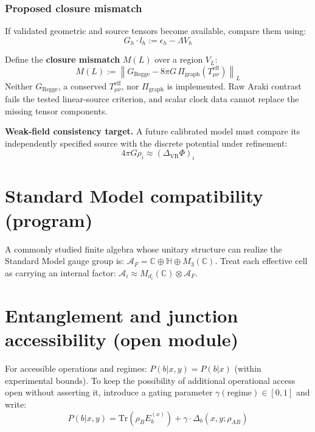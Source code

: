 \documentclass[reprint, amsmath, amssymb, aps, prd]{revtex4-2}
\begin{document}
\subsubsection{Proposed closure mismatch}
If validated geometric and source tensors become available, compare them using:
\begin{equation}
G_h \cdot l_h := \epsilon_h - \Lambda V_h
\end{equation}

Define the \textbf{closure mismatch} $M(L)$ over a region $V_L$:
\begin{equation}
M(L) := \left\| G_{\text{Regge}} - 8\pi G \, \Pi_{\text{graph}}(T_{\mu\nu}^{\text{eff}}) \right\|_L
\end{equation}
Neither $G_{\text{Regge}}$, a conserved $T_{\mu\nu}^{\text{eff}}$, nor $\Pi_{\text{graph}}$ is implemented. Raw Araki contrast fails the tested linear-source criterion, and scalar clock data cannot replace the missing tensor components.

\textbf{Weak-field consistency target.} A future calibrated model must compare its independently specified source with the discrete potential under refinement:
\begin{equation}
4\pi G \rho_i \approx (\Delta_{\text{VR}} \Phi)_i
\end{equation}

\section{Standard Model compatibility (program)}
A commonly studied finite algebra whose unitary structure can realize the Standard Model gauge group is: $\mathcal{A}_F = \mathbb{C} \oplus \mathbb{H} \oplus M_3(\mathbb{C})$. Treat each effective cell as carrying an internal factor: $\mathcal{A}_i \approx M_{d_i}(\mathbb{C}) \otimes \mathcal{A}_F$.

\section{Entanglement and junction accessibility (open module)}
For accessible operations and regimes: $P(b | x, y) = P(b | x)$ (within experimental bounds).
To keep the possibility of additional operational access open without asserting it, introduce a gating parameter $\gamma(\text{regime}) \in [0, 1]$ and write:
\begin{equation}
P(b | x, y) = \text{Tr}(\rho_B E_b^{(x)}) + \gamma \cdot \Delta_b(x, y; \rho_{AB})
\end{equation}
\end{document}

